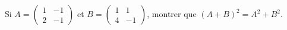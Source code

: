 \begin{exercice}\label{exoLineraire0006}

Si $A=\begin{pmatrix}
	1	&	-1	\\ 
	2	&	-1	
\end{pmatrix}$ et $B=\begin{pmatrix}
	1	&	1	\\ 
	4	&	-1	
\end{pmatrix}$, montrer que $(A+B)^2=A^2+B^2$.


\end{exercice}
